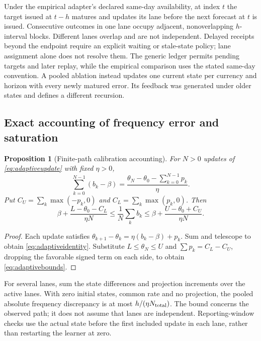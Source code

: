 \documentclass[11pt,a4paper]{article}
\newtheorem{proposition}[theorem]{Proposition}
\theoremstyle{definition}\newtheorem{definition}[theorem]{Definition}
\begin{document}
Under the empirical adapter's declared same-day availability, at index $t$ the target issued at $t-h$ matures and updates its lane before the next forecast at $t$ is issued. Consecutive outcomes in one lane occupy adjacent, nonoverlapping $h$-interval blocks. Different lanes overlap and are not independent. Delayed receipts beyond the endpoint require an explicit waiting or stale-state policy; lane assignment alone does not resolve them. The generic ledger permits pending targets and later replay, while the empirical comparison uses the stated same-day convention. A pooled ablation instead updates one current state per currency and horizon with every newly matured error. Its feedback was generated under older states and defines a different recursion.

\subsection{Exact accounting of frequency error and saturation}
\begin{proposition}[Finite-path calibration accounting]\label{prop:adaptiveaccounting}
For $N>0$ updates of \eqref{eq:adaptiveupdate} with fixed $\eta>0$,
\begin{equation}
 \sum_{k=0}^{N-1}(b_k-\beta)
 =\frac{\theta_N-\theta_0-\sum_{k=0}^{N-1}p_k}{\eta}.
 \label{eq:adaptiveidentity}
\end{equation}
Put $C_U=\sum_k\max(-p_k,0)$ and $C_L=\sum_k\max(p_k,0)$. Then
\begin{equation}
 \beta+\frac{L-\theta_0-C_L}{\eta N}
 \le\frac1N\sum_k b_k
 \le\beta+\frac{U-\theta_0+C_U}{\eta N}.
 \label{eq:adaptivebounds}
\end{equation}
\end{proposition}
\begin{proof}
Each update satisfies $\theta_{k+1}-\theta_k=\eta(b_k-\beta)+p_k$. Sum and telescope to obtain \eqref{eq:adaptiveidentity}. Substitute $L\le\theta_N\le U$ and $\sum p_k=C_L-C_U$, dropping the favorable signed term on each side, to obtain \eqref{eq:adaptivebounds}.
\end{proof}
For several lanes, sum the state differences and projection increments over the active lanes. With zero initial states, common rate and no projection, the pooled absolute frequency discrepancy is at most $h/(\eta N_{\rm total})$. The bound concerns the observed path; it does not assume that lanes are independent. Reporting-window checks use the actual state before the first included update in each lane, rather than restarting the learner at zero.
\end{document}
